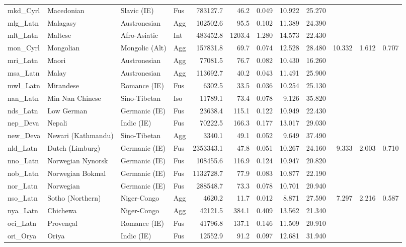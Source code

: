 \begin{tabular}{ll l l rr rr r rr r}
mkd\_Cyrl & Macedonian & Slavic (IE) & Fus & 783127.7 & 46.2 & 0.049 & 10.922 & 25.270 &  &  &  \\
mlg\_Latn & Malagasy & Austronesian & Agg & 102502.6 & 95.5 & 0.102 & 11.389 & 24.390 &  &  &  \\
mlt\_Latn & Maltese & Afro-Asiatic & Int & 483452.8 & 1203.4 & 1.280 & 14.573 & 22.430 &  &  &  \\
mon\_Cyrl & Mongolian & Mongolic (Alt) & Agg & 157831.8 & 69.7 & 0.074 & 12.528 & 28.480 & 10.332 & 1.612 & 0.707 \\
mri\_Latn & Maori & Austronesian & Agg & 77081.5 & 76.7 & 0.082 & 10.430 & 16.260 &  &  &  \\
msa\_Latn & Malay & Austronesian & Agg & 113692.7 & 40.2 & 0.043 & 11.491 & 25.900 &  &  &  \\
mwl\_Latn & Mirandese & Romance (IE) & Fus & 6302.5 & 33.5 & 0.036 & 10.254 & 25.130 &  &  &  \\
nan\_Latn & Min Nan Chinese & Sino-Tibetan & Iso & 11789.1 & 73.4 & 0.078 & 9.126 & 35.820 &  &  &  \\
nds\_Latn & Low German & Germanic (IE) & Fus & 23638.4 & 115.1 & 0.122 & 10.949 & 22.430 &  &  &  \\
nep\_Deva & Nepali & Indic (IE) & Fus & 70222.5 & 166.3 & 0.177 & 13.017 & 29.030 &  &  &  \\
new\_Deva & Newari (Kathmandu) & Sino-Tibetan & Agg & 3340.1 & 49.1 & 0.052 & 9.649 & 37.490 &  &  &  \\
nld\_Latn & Dutch (Limburg) & Germanic (IE) & Fus & 2353343.1 & 47.8 & 0.051 & 10.267 & 24.160 & 9.333 & 2.003 & 0.710 \\
nno\_Latn & Norwegian Nynorsk & Germanic (IE) & Fus & 108455.6 & 116.9 & 0.124 & 10.947 & 20.820 &  &  &  \\
nob\_Latn & Norwegian Bokmal & Germanic (IE) & Fus & 1132728.7 & 77.9 & 0.083 & 10.877 & 22.190 &  &  &  \\
nor\_Latn & Norwegian & Germanic (IE) & Fus & 288548.7 & 73.3 & 0.078 & 10.701 & 20.940 &  &  &  \\
nso\_Latn & Sotho (Northern) & Niger-Congo & Agg & 4620.2 & 11.7 & 0.012 & 8.871 & 27.590 & 7.297 & 2.216 & 0.587 \\
nya\_Latn & Chichewa & Niger-Congo & Agg & 42121.5 & 384.1 & 0.409 & 13.562 & 21.340 &  &  &  \\
oci\_Latn & Provençal & Romance (IE) & Fus & 41796.8 & 137.1 & 0.146 & 11.509 & 20.910 &  &  &  \\
ori\_Orya & Oriya & Indic (IE) & Fus & 12552.9 & 91.2 & 0.097 & 12.681 & 31.940 &  &  &  \\

\end{tabular}
